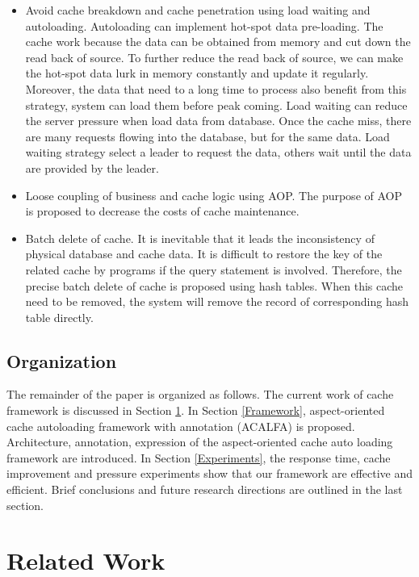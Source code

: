 \documentclass{singlecol-new}
\theoremstyle{TH}{
\newtheorem{lemma}{Lemma}
\newtheorem{theorem}[lemma]{Theorem}
\newtheorem{corrolary}[lemma]{Corrolary}
\newtheorem{conjecture}[lemma]{Conjecture}
\newtheorem{proposition}[lemma]{Proposition}
\newtheorem{claim}[lemma]{Claim}
\newtheorem{stheorem}[lemma]{Wrong Theorem}
}
\theoremstyle{THrm}{
\newtheorem{definition}{Definition}[section]
\newtheorem{question}{Question}[section]
\newtheorem{remark}{Remark}
\newtheorem{scheme}{Scheme}
}
\theoremstyle{THhit}{
\newtheorem{case}{Case}[section]
}
\begin{document}
\begin{itemize}
  \item Avoid cache breakdown and cache penetration using load waiting and autoloading. Autoloading can implement hot-spot data pre-loading. The cache work because the data can be obtained from memory and cut down the read back of source. To further reduce the read back of source, we can make the hot-spot data lurk in memory constantly and update it regularly. Moreover, the data that need to a long time to process also benefit from this strategy, system can load them before peak coming. Load waiting can reduce the server pressure when load data from database. Once the cache miss, there are many requests flowing into the database, but for the same data. Load waiting strategy select a leader to request the data, others wait until the data are provided by the leader.
  \item Loose coupling of business and cache logic using AOP. The purpose of AOP is proposed to decrease the costs of cache maintenance.
  \item Batch delete of cache. It is inevitable that it leads the inconsistency of physical database and cache data. It is difficult to restore the key of the related cache by programs if the query statement is involved. Therefore, the precise batch delete of cache is proposed using hash tables. When this cache need to be removed, the system will remove the record of corresponding hash table directly.
\end{itemize}

\subsection{Organization}
The remainder of the paper is organized as follows. The current work of cache framework is discussed in Section \ref{RelatedWork}. In Section \ref{Framework}, aspect-oriented cache autoloading framework with annotation (ACALFA) is proposed. Architecture, annotation, expression of the aspect-oriented cache auto loading framework are introduced. In Section \ref{Experiments}, the response time, cache improvement and pressure experiments show that our framework are effective and efficient. Brief conclusions and future research directions are outlined in the last section.


\section{Related Work}
\label{RelatedWork}
\end{document}
